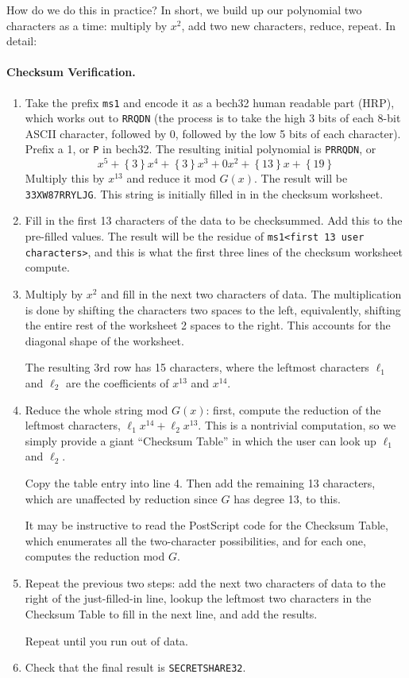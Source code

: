 \documentclass[letterpaper]{article}
\newcommand{\binrep}[1]{\left\{#1\right\}}
\newcommand{\vc}[1]{\texttt{#1}} %
\begin{document}
How do we do this in practice? In short, we build up our polynomial two characters
as a time: multiply by $x^2$, add two new characters, reduce, repeat. In detail:

\paragraph{Checksum Verification.}

\begin{enumerate}
\item Take the prefix \vc{ms1} and encode it as a bech32 human readable part (HRP),
which works out to \vc{RRQDN} (the process is to take the high 3 bits of each
8-bit ASCII character, followed by 0, followed by the low 5 bits of each character).
Prefix a 1, or \vc{P} in bech32. The resulting initial polynomial is \vc{PRRQDN}, or
\[ x^5 + \binrep{3}x^4 + \binrep{3}x^3 + 0x^2 + \binrep{13}x + \binrep{19} \]
Multiply this by $x^{13}$ and reduce it mod $G(x)$. The result will be
\vc{33XW87RRYLJG}. This string is initially filled in in the checksum
worksheet.

\item Fill in the first 13 characters of the data to be checksummed. Add this to
the pre-filled values. The result will be the residue of \vc{ms1<first 13 user characters>},
and this is what the first three lines of the checksum worksheet compute.

\item Multiply by $x^2$ and fill in the next two characters of data. The multiplication
is done by shifting the characters two spaces to the left, equivalently, shifting the
entire rest of the worksheet 2 spaces to the right. This accounts for the diagonal
shape of the worksheet.

The resulting 3rd row has 15 characters, where the leftmost characters $\ell_1$
and $\ell_2$ are the coefficients of $x^{13}$ and $x^{14}$.

\item Reduce the whole string mod $G(x)$: first, compute the reduction of the
leftmost characters, $\ell_1x^{14} + \ell_2x^{13}$. This is a nontrivial
computation, so we simply provide a giant ``Checksum Table'' in which the user
can look up $\ell_1$ and $\ell_2$.

Copy the table entry into line 4. Then add the remaining 13 characters, which
are unaffected by reduction since $G$ has degree 13, to this.

It may be instructive to read the PostScript code for the Checksum Table, which
enumerates all the two-character possibilities, and for each one, computes
the reduction mod $G$.

\item Repeat the previous two steps: add the next two characters of data to the
right of the just-filled-in line, lookup the leftmost two characters in the
Checksum Table to fill in the next line, and add the results.

Repeat until you run out of data.
\item Check that the final result is \vc{SECRETSHARE32}.
\end{enumerate}
\end{document}

